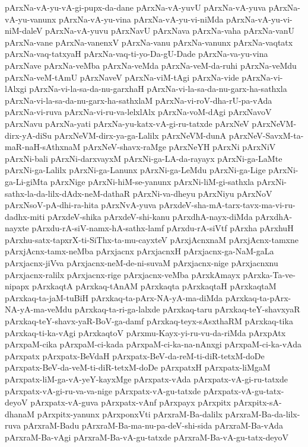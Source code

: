 {pArxNa-vA-yu-vA-gi-pupx-da-dane
pArxNa-vA-yuvU
pArxNa-vA-yuva
pArxNa-vA-yu-vanunx
pArxNa-vA-yu-vina
pArxNa-vA-yu-vi-niMda
pArxNa-vA-yu-vi-niM-daleV
pArxNa-vA-yuvu
pArxNavU
pArxNava
pArxNa-vaha
pArxNa-vanU
pArxNa-vane
pArxNa-vanenxV
pArxNa-vanu
pArxNa-vanunx
pArxNa-vaqtatx
pArxNa-vaq-tatxyaH
pArxNa-vaq-ti-yo-Da-gU-Dade
pArxNa-va-yu-vina
pArxNave
pArxNa-veMba
pArxNa-veMda
pArxNa-veM-da-ruhi
pArxNa-veMdu
pArxNa-veM-tAmU
pArxNaveV
pArxNa-viM-tAgi
pArxNa-vide
pArxNa-vi-lAlxgi
pArxNa-vi-la-sa-da-nu-garxhaH
pArxNa-vi-la-sa-da-nu-garx-ha-sathxla
pArxNa-vi-la-sa-da-nu-garx-ha-sathxlaM
pArxNa-vi-roV-dha-rU-pa-vAda
pArxNa-vi-ruva
pArxNa-vi-ru-va-lelxlAlx
pArxNa-voM-dAgi
pArxNavoV
pArxNavu
pArxNa-yati
pArxNa-yu-katx-vA-gi-ru-tatxde
pArxNeV
pArxNeVM-dirx-yA-diSu
pArxNeVM-dirx-ya-ga-Lalilx
pArxNeVM-dunA
pArxNeV-SavxM-ta-maR-naH-sAthxnaM
pArxNeV-shavx-raMge
pArxNeYH
pArxNi
pArxNiV
pArxNi-bali
pArxNi-darxvayxM
pArxNi-ga-LA-da-rayayx
pArxNi-ga-LaMte
pArxNi-ga-Lalilx
pArxNi-ga-Lanunx
pArxNi-ga-LeMdu
pArxNi-ga-Lige
pArxNi-ga-Li-giMta
pArxNige
pArxNi-hiM-se-yanunx
pArxNi-liM-gi-sathxla
pArxNi-sathx-la-da-lilx-dAdx-neM-dathaR
pArxNi-va-dheyu
pArxNiyu
pArxNoV
pArxNsoV-pA-dhi-ra-hita
pArxNvA-yuva
pArxdeV-sha-mA-tarx-tavx-ma-vi-ru-dadhx-miti
pArxdeV-shika
pArxdeV-shi-kanu
pArxdhA-nayx-diMda
pArxdhA-nayxte
pArxdu-rA-siV-namx-hA-sathx-lamf
pArxdu-rA-siVtf
pArxha
pArxhuH
pArxhu-satx-tapxrX-ti-SiThx-ta-mu-cayxteV
pArxjAcnxnaM
pArxjAcnx-tamxne
pArxjAcnx-tamx-neMba
pArxjacnx
pArxjacnxH
pArxjacnx-ga-NaM-gaLa
pArxjacnx-jiVva
pArxjacnx-neM-de-ni-suvaM
pArxjacnx-nige
pArxjacnxnu
pArxjacnx-ralilx
pArxjacnx-rige
pArxjacnx-veMba
pArxkAmayx
pArxka-Ta-ve-nipapx
pArxkaqtA
pArxkaq-tAnAM
pArxkaqta
pArxkaqtaH
pArxkaqtaM
pArxkaq-ta-jaM-tuBiH
pArxkaq-ta-pArx-NA-yA-ma-diMda
pArxkaq-ta-pArx-NA-yA-ma-veMdu
pArxkaq-ta-ri-ga-lalxde
pArxkaq-taru
pArxkaq-teY-shavxyaR
pArxkaq-teY-shavx-yaR-BoV-ga-damf
pArxkaq-teyx-sAsxthaRM
pArxkaq-tika
pArxkaq-ti-ka-vAgi
pArxkaqtoV
pArxmu-Kayx-yi-ru-vu-da-riMda
pArxpAtx
pArxpaM-cika
pArxpaM-ci-kada
pArxpaM-ci-ka-na-nAnxgi
pArxpaM-ci-ka-vAda
pArxpatx
pArxpatx-BeVdaH
pArxpatx-BeV-da-reM-ti-diR-tetxM-doDe
pArxpatx-BeV-da-veM-ti-diR-tetxM-doDe
pArxpatxH
pArxpatx-liMgaM
pArxpatx-liM-ga-vA-yeY-kayxMge
pArxpatx-vAda
pArxpatx-vA-gi-ru-tatxde
pArxpatx-vA-gi-ru-va-va-nige
pArxpatx-vA-gu-tatxde
pArxpatx-vA-gu-tatx-deyoV
pArxpatx-vA-guva
pArxpatx-vAnf
pArxpayx
pArxpitx
pArxpitx-sA-dhanaM
pArxpitx-yanunx
pArxponxVti
pArxraM-Ba-dalilx
pArxraM-Ba-da-lilx-ruva
pArxraM-Badu
pArxraM-Ba-ma-nu-pa-deV-shi-sida
pArxraM-Ba-vAda
pArxraM-Ba-vAgi
pArxraM-Ba-vA-gu-tatxde
pArxraM-Ba-vA-gu-tatx-deyoV
}
